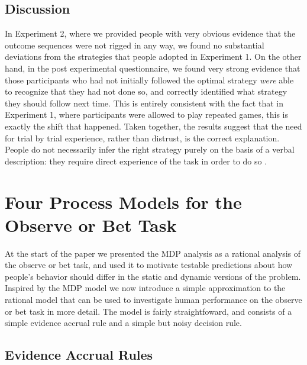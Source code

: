 \documentclass[authoryear]{elsarticle}
\newcommand{\sectionX}[1]{\section{#1}}
\newcommand{\subsectionX}[1]{\subsection{#1}}
\begin{document}
\subsectionX{Discussion}

In Experiment 2, where we provided people with very obvious evidence that the outcome sequences were not rigged in any way, we found no substantial deviations from the strategies that people adopted in Experiment 1. On the other hand, in the post experimental questionnaire, we found very strong evidence that those participants who had not initially followed the optimal strategy {\it were} able to recognize that they had not done so, and correctly identified what strategy they should follow next time. This is entirely consistent with the fact that in Experiment 1, where participants were allowed to play repeated games, this is exactly the shift that happened. Taken together, the results suggest that the need for trial by trial experience, rather than distrust, is the correct explanation. People do not necessarily infer the right strategy purely on the basis of a verbal description: they require direct experience of the task in order to do so \citep[cf][]{newell_role_2007,newell_probability_2013}.

\sectionX{Four Process Models for the Observe or Bet Task}

At the start of the paper we presented the MDP analysis as a rational analysis of the observe or bet task, and used it to motivate testable predictions about how people's behavior should differ in the static and dynamic versions of the problem. Inspired by the MDP model we now introduce a simple approximation to the rational model that can be used to investigate human performance on the observe or bet task in more detail. The model is fairly straightfoward, and consists of a simple evidence accrual rule and a simple but noisy decision rule.

\subsectionX{Evidence Accrual Rules}
\end{document}
